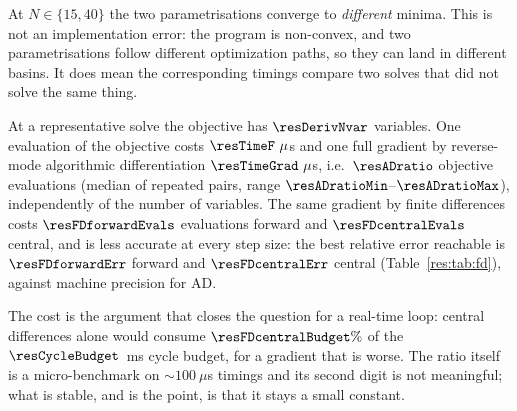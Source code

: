 At $N\in\{15, 40\}$ the two parametrisations converge to \emph{different} minima. This is not an implementation error: the program is non-convex, and two parametrisations follow different optimization paths, so they can land in different basins. It does mean the corresponding timings compare two solves that did not solve the same thing.

\begin{table}[htbp]
  \centering
  \small
  \caption{Multiple (M) against single (S) shooting on the same instance. Dimensions, densities and iteration counts are exact; each timing is the fastest of three cold solves, with no warm start.}
  \label{res:tab:shoot}
\end{table}

\label{res:ad}


At a representative solve the objective has $\resDerivNvar$ variables. One evaluation of the objective costs $\resTimeF~\mu$s and one full gradient by reverse-mode algorithmic differentiation $\resTimeGrad~\mu$s, i.e.\ $\resADratio$ objective evaluations (median of repeated pairs, range $\resADratioMin$--$\resADratioMax$), independently of the number of variables. The same gradient by finite differences costs $\resFDforwardEvals$ evaluations forward and $\resFDcentralEvals$ central, and is less accurate at every step size: the best relative error reachable is $\resFDforwardErr$ forward and $\resFDcentralErr$ central (Table~\ref{res:tab:fd}), against machine precision for AD.

The cost is the argument that closes the question for a real-time loop: central differences alone would consume $\resFDcentralBudget\%$ of the $\resCycleBudget$~ms cycle budget, for a gradient that is worse. The ratio itself is a micro-benchmark on $\sim100~\mu$s timings and its second digit is not meaningful; what is stable, and is the point, is that it stays a small constant.

\begin{table}[htbp]
  \centering
  \small
  \caption{Accuracy of the finite-difference gradient against the step size, measured against the AD gradient. The optimum sits at $h=1.49\times 10^{-8}$ forward (theory: $\sqrt{\varepsilon}=1.49\times 10^{-8}$) and $h=6.06\times 10^{-6}$ central (theory: $\varepsilon^{1/3}=6.06\times 10^{-6}$).}
  \label{res:tab:fd}
\end{table}


